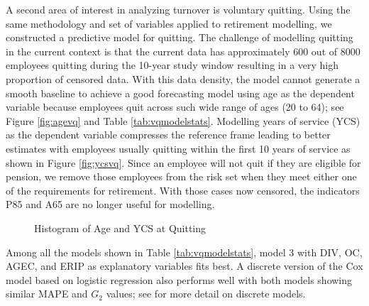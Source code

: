 \documentclass[12pt,letterpaper]{article}
\begin{document}
A second area of interest in analyzing turnover is voluntary quitting.  Using the same methodology and set of variables applied to retirement modelling, we constructed a predictive model for quitting. The challenge of modelling quitting in the current context is that the current data has approximately 600 out of 8000 employees quitting during the 10-year study window resulting in a very high proportion of censored data.  With this data density, the model cannot generate a smooth baseline to achieve a good forecasting model using age as the dependent variable because employees quit across such wide range of ages (20 to 64); see Figure \ref{fig:agevq} and Table \ref{tab:vqmodelstats}.  Modelling years of service (YCS) as the dependent variable compresses the reference frame leading to better estimates with employees usually quitting within the first 10 years of service as shown in Figure \ref{fig:ycsvq}. Since an employee will not quit if they are eligible for pension, we remove those employees from the risk set when they meet either one of the requirements for retirement.  With those cases now censored, the indicators P85 and A65 are no longer useful for modelling.
\begin{figure}[h!]
	\centering
	\caption{Histogram of Age and YCS at Quitting}
	\label{fig:vqhist}
\end{figure}
Among all the models shown in Table \ref{tab:vqmodelstats}, model 3 with DIV, OC, AGEC, and ERIP as explanatory variables fits best.  A discrete version of the Cox model based on logistic regression also performs well with both models showing similar MAPE and $G_2$ values; see \citet{allison2010} for more detail on discrete models.
\end{document}
